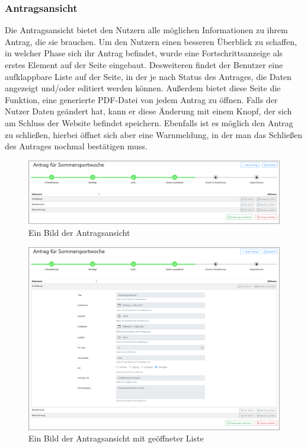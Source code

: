 \subsubsection{Antragsansicht}
\label{chapter:implementierung-frontend-komponenten-antragsansicht}
Die Antragsansicht bietet den Nutzern alle möglichen Informationen zu ihrem Antrag, die sie brauchen. Um den Nutzern einen besseren Überblick zu schaffen, in welcher Phase sich ihr Antrag befindet, wurde eine Fortschrittsanzeige als erstes Element auf der Seite eingebaut. Desweiteren findet der Benutzer eine aufklappbare Liste auf der Seite, in der je nach Status des Antrages, die Daten angezeigt und/oder editiert werden können. Außerdem bietet diese Seite die Funktion, eine generierte PDF-Datei von jedem Antrag zu öffnen. Falls der Nutzer Daten geändert hat, kann er diese Änderung mit einem Knopf, der sich am Schluss der Website befindet speichern. Ebenfalls ist es möglich den Antrag zu schließen, hierbei öffnet sich aber eine Warnmeldung, in der man das Schließen des Antrages nochmal bestätigen muss.
\begin{figure}[H]
	\centering
	\includegraphics[width=1\linewidth]{images/website/antrag_zu}
	\caption[Antragsansicht]{Ein Bild der Antragsansicht}
	\label{fig:antragaktivdetail}
\end{figure}
\begin{figure}[H]
	\centering
	\includegraphics[width=1\linewidth]{images/website/antrag}
	\caption[Antragsansicht geöffnet]{Ein Bild der Antragsansicht mit geöffneter Liste}
	\label{fig:antragaktivdetail}
\end{figure}
